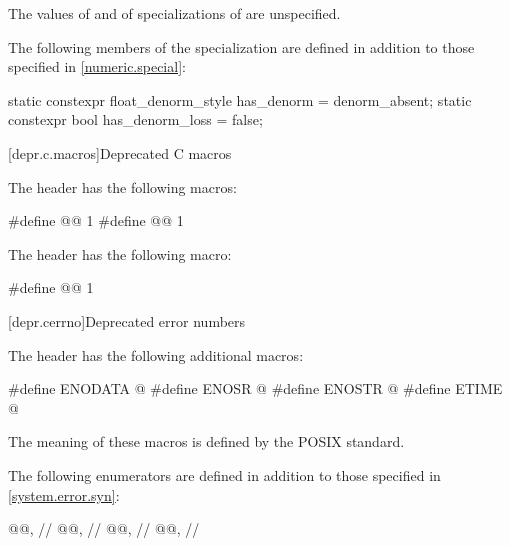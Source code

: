 \pnum
The values of  and  of
specializations of  are unspecified.

\pnum
The following members of the specialization  are defined
in addition to those specified in \ref{numeric.special}:
%
%
\begin{codeblock}
static constexpr float_denorm_style has_denorm = denorm_absent;
static constexpr bool has_denorm_loss = false;
\end{codeblock}

[depr.c.macros]{Deprecated C macros}

\pnum
The header  has the following macros:
%
%
\begin{codeblock}
#define @@ 1
#define @@ 1
\end{codeblock}

\pnum
The header  has the following macro:
%
%
%
\begin{codeblock}
#define @@ 1
\end{codeblock}

[depr.cerrno]{Deprecated error numbers}

\pnum
The header  has the following additional macros:

%
%
%
%
\begin{codeblock}
#define ENODATA @\seebelow@
#define ENOSR @\seebelow@
#define ENOSTR @\seebelow@
#define ETIME @\seebelow@
\end{codeblock}

\pnum
The meaning of these macros is defined by the POSIX standard.

\pnum
The following  enumerators are defined
in addition to those specified in \ref{system.error.syn}:

\begin{codeblock}
@@,               // 
@@,                // 
@@,                       // 
@@,                     // 
\end{codeblock}

